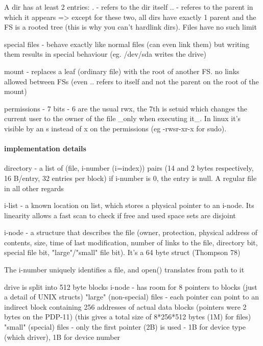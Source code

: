 \documentclass[a4paper]{report}
\begin{document}
        A dir has at least 2 entries:
            . - refers to the dir itself
            .. - referes to the parent in which it appears
        => except for these two, all dirs have exactly 1 parent and the FS is a
        rooted tree (this is why you can't hardlink dirs). Files have no such limit

        special files - behave exactly like normal files (can even link them)
        but writing them results in special behaviour (eg. /dev/sda writes the
        drive)

        mount - replaces a leaf (ordinary file) with the root of another FS.
        no links allowed between FSs (even .. refers to itself and not the
        parent on the root of the mount)

        permissions - 7 bits - 6 are the usual rwx, the 7th is setuid which
        changes the current user to the owner of the file \_only when executing
        it\_. In linux it's visible by an s instead of x on the permissions (eg
        -rwsr-xr-x for sudo).

        \paragraph{implementation details}

        directory - a list of (file, i-number (i=index)) pairs (14 and 2 bytes
        respectively, 16 B/entry, 32 entries per block) if i-number is 0, the
        entry is null. A regular file in all other regards

        i-list - a known location on list, which stores a physical pointer to
        an i-node. Its linearity allows a fast scan to check if free and used
        space sets are disjoint

        i-node - a structure that describes the file (owner, protection,
        physical address of contents, size, time of last modification, number
        of links to the file, directory bit, special file bit, "large"/"small" file
        bit). It's a 64 byte struct (Thompson 78)

        The i-number uniquely identifies a file, and open() translates from
        path to it

        drive is split into 512 byte blocks
        i-node - has room for 8 pointers to blocks (just a detail of UNIX structs)
        "large" (non-special) files - each pointer can point to an indirect
        block containing 256 addresses of actual data blocks (pointers were 2
        bytes on the PDP-11) (this gives a total size of 8*256*512 bytes (1M)
        for files)
        "small" (special) files - only the first pointer (2B) is used - 1B for
        device type (which driver), 1B for device number
\end{document}
